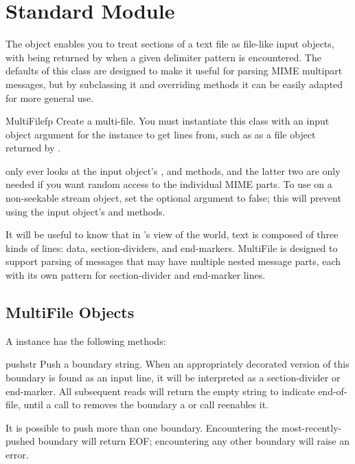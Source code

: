 \section{Standard Module }



The  object enables you to treat sections of a text
file as file-like input objects, with  being returned by
 when a given delimiter pattern is encountered.  The
defaults of this class are designed to make it useful for parsing
MIME multipart messages, but by subclassing it and overriding methods 
it can be easily adapted for more general use.

\begin{classdesc}{MultiFile}{fp}
Create a multi-file.  You must instantiate this class with an input
object argument for the  instance to get lines from,
such as as a file object returned by .

 only ever looks at the input object's
,  and  methods, and
the latter two are only needed if you want random access to the
individual MIME parts. To use  on a non-seekable
stream object, set the optional  argument to false; this
will prevent using the input object's  and
 methods.
\end{classdesc}

It will be useful to know that in 's view of the world, text
is composed of three kinds of lines: data, section-dividers, and
end-markers.  MultiFile is designed to support parsing of
messages that may have multiple nested message parts, each with its
own pattern for section-divider and end-marker lines.


\subsection{MultiFile Objects \label{MultiFile-objects}}

A  instance has the following methods:

\begin{methoddesc}{push}{str}
Push a boundary string.  When an appropriately decorated version of
this boundary is found as an input line, it will be interpreted as a
section-divider or end-marker.  All subsequent
reads will return the empty string to indicate end-of-file, until a
call to  removes the boundary a or  call
reenables it.

It is possible to push more than one boundary.  Encountering the
most-recently-pushed boundary will return EOF; encountering any other
boundary will raise an error.
\end{methoddesc}

